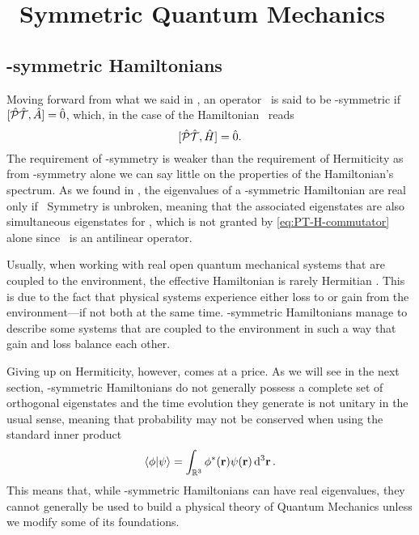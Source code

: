 \chapter{\PT\ Symmetric Quantum Mechanics}\label{ch:pt-symmetric-hamiltonians}
    \section{\PT-symmetric Hamiltonians}
        Moving forward from what we said in , an operator \hA\ is said to be \PT-symmetric if $\comm*{\hPT}{\hA}\! = \hzero$, which, in the case of the Hamiltonian \hH\ reads
        \begin{equation}
            \label{eq:PT-H-commutator}
            \comm*{\hPT}{\hH}\! = \hzero
            \myperiod
        \end{equation}
        The requirement of \PT-symmetry is weaker than the requirement of Hermiticity as from \PT-symmetry alone we can say little on the properties of the Hamiltonian's spectrum. As we found in , the eigenvalues of a \PT-symmetric Hamiltonian are real only if \PT\ Symmetry is unbroken, meaning that the associated eigenstates are also simultaneous eigenstates for \hPT, which is not granted by \eqref{eq:PT-H-commutator} alone since \hPT\ is an antilinear operator.

        Usually, when working with real open quantum mechanical systems that are coupled to the environment, the effective Hamiltonian is rarely Hermitian \cite{bender2024}. This is due to the fact that physical systems experience either loss to or gain from the environment---if not both at the same time. \PT-symmetric  Hamiltonians manage to describe some systems that are coupled to the environment in such a way that gain and loss balance each other.

        Giving up on Hermiticity, however, comes at a price. As we will see in the next section, \PT-symmetric Hamiltonians do not generally possess a complete set of orthogonal eigenstates and the time evolution they generate is not unitary in the usual sense, meaning that probability may not be conserved when using the standard inner product
        \begin{equation}
            \label{eq:standard-inner-product}
            \braket{\phi}{\psi} = \int\nolimits_{\bbR^3} \phi^*\pqty{\vb{r}} \psi\pqty{\vb{r}} \dd[3]{\vb{r}}
            \myperiod
        \end{equation}
        This means that, while \PT-symmetric Hamiltonians can have real eigenvalues, they cannot generally be used to build a physical theory of Quantum Mechanics unless we modify some of its foundations.

